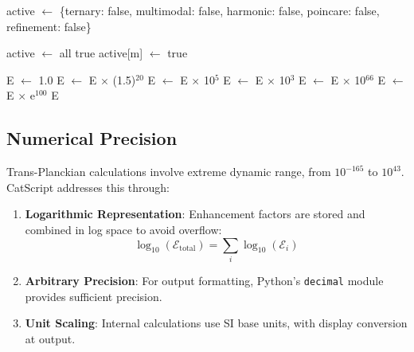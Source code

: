 \documentclass[twocolumn,10pt]{article}
\begin{document}
\begin{algorithm}
\caption{Enhancement Chain}
\begin{algorithmic}[1]
    \State active $\gets$ \{ternary: false, multimodal: false,
    \State \quad\quad\quad\quad harmonic: false, poincare: false,
    \State \quad\quad\quad\quad refinement: false\}
\EndFunction

            \State active $\gets$ all true
        \Else
            \State active[m] $\gets$ true
        \EndIf
    \EndFor
\EndFunction

    \State E $\gets$ 1.0
        \State E $\gets$ E $\times$ (1.5)$^{20}$
    \EndIf
        \State E $\gets$ E $\times$ 10$^5$
    \EndIf
        \State E $\gets$ E $\times$ 10$^3$
    \EndIf
        \State E $\gets$ E $\times$ 10$^{66}$
    \EndIf
        \State E $\gets$ E $\times$ e$^{100}$
    \EndIf
    \State \Return E
\EndFunction
\end{algorithmic}
\end{algorithm}

\subsection{Numerical Precision}

Trans-Planckian calculations involve extreme dynamic range, from $10^{-165}$ to $10^{43}$. CatScript addresses this through:

\begin{enumerate}
    \item \textbf{Logarithmic Representation}: Enhancement factors are stored and combined in log space to avoid overflow:
    \begin{equation}
        \log_{10}(\mathcal{E}_{\text{total}}) = \sum_i \log_{10}(\mathcal{E}_i)
    \end{equation}

    \item \textbf{Arbitrary Precision}: For output formatting, Python's \texttt{decimal} module provides sufficient precision.

    \item \textbf{Unit Scaling}: Internal calculations use SI base units, with display conversion at output.
\end{enumerate}
\end{document}
